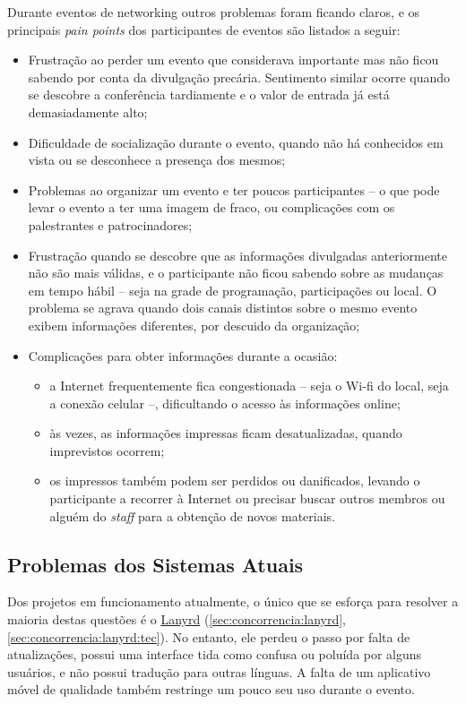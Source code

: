 \documentclass[12pt,a4paper,twoside,hyphens,english,brazil]{abntex2}
\begin{document}
Durante eventos de networking outros problemas foram ficando claros, e os principais \emph{pain points} dos participantes de eventos são listados a seguir:

\begin{itemize}
	\item Frustração ao perder um evento que considerava importante mas não ficou sabendo por conta da divulgação precária. Sentimento similar ocorre quando se descobre a conferência tardiamente e o valor de entrada já está demasiadamente alto;
	\item Dificuldade de socialização durante o evento, quando não há conhecidos em vista ou se desconhece a presença dos mesmos;
	\item Problemas ao organizar um evento e ter poucos participantes -- o que pode levar o evento a ter uma imagem de fraco, ou complicações com os palestrantes e patrocinadores;
	\item Frustração quando se descobre que as informações divulgadas anteriormente não são mais válidas, e o participante não ficou sabendo sobre as mudanças em tempo hábil -- seja na grade de programação, participações ou local. O problema se agrava quando dois canais distintos sobre o mesmo evento exibem informações diferentes, por descuido da organização;
	\item Complicações para obter informações durante a ocasião:
		\begin{itemize}
			\item a Internet frequentemente fica congestionada -- seja o Wi-fi do local, seja a conexão celular --, dificultando o acesso às informações online;
			\item às vezes, as informações impressas ficam desatualizadas, quando imprevistos ocorrem;
			\item os impressos também podem ser perdidos ou danificados, levando o participante a recorrer à Internet ou precisar buscar outros membros ou alguém do \emph{staff} para a obtenção de novos materiais.
		\end{itemize} 
\end{itemize}

\subsection{Problemas dos Sistemas Atuais}
Dos projetos em funcionamento atualmente, o único que se esforça para resolver a maioria destas questões é o \underline{Lanyrd} (\autoref{sec:concorrencia:lanyrd}, \autoref{sec:concorrencia:lanyrd:tec}). No entanto, ele perdeu o passo por falta de atualizações, possui uma interface tida como confusa ou poluída por alguns usuários, e não possui tradução para outras línguas. A falta de um aplicativo móvel de qualidade também restringe um pouco seu uso durante o evento.
\end{document}
